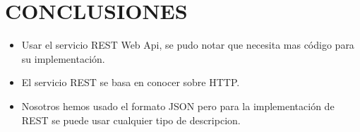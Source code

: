 \section{CONCLUSIONES}

\begin{itemize}
	\item Usar el servicio REST Web Api, se pudo notar que necesita mas código para su implementación.
	\item El servicio REST se basa en conocer sobre HTTP.
	\item Nosotros hemos usado el formato JSON pero para la implementación de REST se puede usar cualquier tipo de descripcion.
\end{itemize}